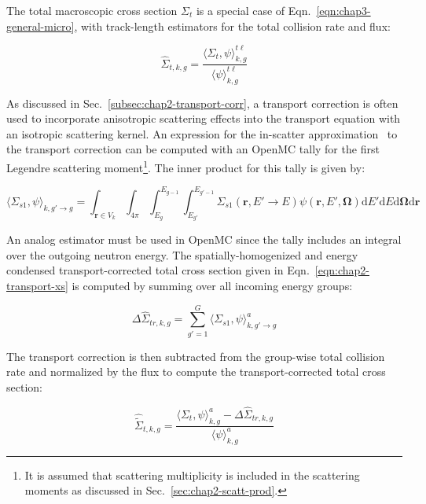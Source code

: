 The total macroscopic cross section $\Sigma_{t}$ is a special case of Eqn.~\ref{eqn:chap3-general-micro}, with track-length estimators for the total collision rate and flux:

\begin{equation}
\label{eqn:chap3-total-macro}
\hat{\Sigma}_{t,k,g} = \frac{\langle \Sigma_{t}, \psi \rangle_{k,g}^{t\ell}}{\langle \psi \rangle_{k,g}^{t\ell}}
\end{equation}

As discussed in Sec.~\ref{subsec:chap2-transport-corr}, a transport correction is often used to incorporate anisotropic scattering effects into the transport equation with an isotropic scattering kernel. An expression for the in-scatter approximation~\cite{yamamoto2008simplified} to the transport correction can be computed with an OpenMC tally for the first Legendre scattering moment\footnote{It is assumed that scattering multiplicity is included in the scattering moments as discussed in Sec.~\ref{sec:chap2-scatt-prod}.}. The inner product for this tally is given by:

\begin{equation}
\label{eqn:chap3-sigs1}
\langle \Sigma_{s1}, \psi \rangle_{k,g'\rightarrow g} = \int_{\mathbf{r} \in V_{k}} \int_{4\pi} \int_{E_{g}}^{E_{g-1}} \int_{E_{g'}}^{E_{g'-1}} \Sigma_{s1}(\mathbf{r},E'\rightarrow E)\psi(\mathbf{r},E',\mathbf{\Omega}) \mathrm{d}E'\mathrm{d}E\mathrm{d}\mathbf{\Omega}\mathrm{d}\mathbf{r}
\end{equation}

\noindent An analog estimator must be used in OpenMC since the tally includes an integral over the outgoing neutron energy. The spatially-homogenized and energy condensed transport-corrected total cross section given in Eqn.~\ref{eqn:chap2-transport-xs} is computed by summing over all incoming energy groups:

\begin{equation}
\label{eqn:chap3-transport-corr-macro}
\Delta\hat{\Sigma}_{tr,k,g} = \displaystyle\sum\limits_{g'=1}^{G} \langle{\Sigma_{s1}, \psi \rangle_{k,g'\rightarrow g}^{a}}
\end{equation}

\noindent The transport correction is then subtracted from the group-wise total collision rate and normalized by the flux to compute the transport-corrected total cross section:

\begin{equation}
\label{eqn:chap3-sigt-transport-macro}
\hat{\tilde{\Sigma}}_{t,k,g} = \frac{\langle \Sigma_{t}, \psi \rangle_{k,g}^{a} - \Delta\hat{\Sigma}_{tr,k,g}}{\langle \psi \rangle_{k,g}^{a}}
\end{equation}

